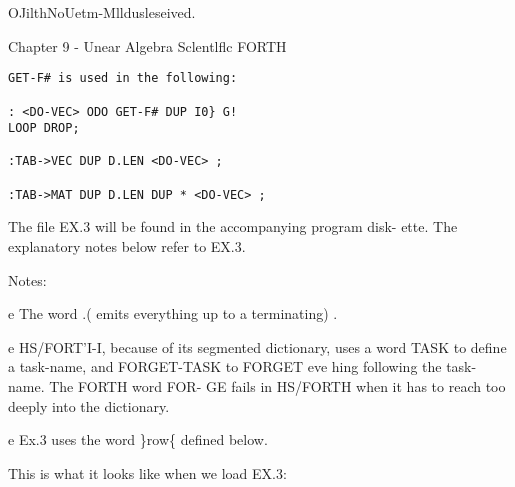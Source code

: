 OJilthNoUetm-Mlldusleseived.

Chapter 9 - Unear Algebra Sclentlflc FORTH

\begin{verbatim}
GET-F# is used in the following:

: <DO-VEC> ODO GET-F# DUP I0} G!
LOOP DROP;

:TAB->VEC DUP D.LEN <DO-VEC> ;

:TAB->MAT DUP D.LEN DUP * <DO-VEC> ;
\end{verbatim}

The file EX.3 will be found in the accompanying program disk-
ette. The explanatory notes below refer to EX.3.

Notes:

e The word .( emits everything up to a terminating) .

e HS/FORT'I-I, because of its segmented dictionary, uses a word
TASK to define a task-name, and FORGET-TASK to FORGET
eve hing following the task-name. The FORTH word FOR-
GE fails in HS/FORTH when it has to reach too deeply into
the dictionary.

e Ex.3 uses the word \}row\{ defined below.

This is what it looks like when we load EX.3:

